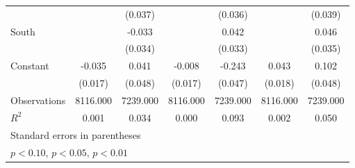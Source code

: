 {\begin{tabular}{l*{6}{c}}
                    &                     &     (0.037)         &                     &     (0.036)         &                     &     (0.039)         \\
\addlinespace
South               &                     &      -0.033         &                     &       0.042         &                     &       0.046         \\
                    &                     &     (0.034)         &                     &     (0.033)         &                     &     (0.035)         \\
\addlinespace
Constant            &      -0.035\sym{**} &       0.041         &      -0.008         &      -0.243\sym{***}&       0.043\sym{**} &       0.102\sym{**} \\
                    &     (0.017)         &     (0.048)         &     (0.017)         &     (0.047)         &     (0.018)         &     (0.048)         \\
\midrule
Observations        &    8116.000         &    7239.000         &    8116.000         &    7239.000         &    8116.000         &    7239.000         \\
\(R^{2}\)           &       0.001         &       0.034         &       0.000         &       0.093         &       0.002         &       0.050         \\
\bottomrule
\multicolumn{7}{l}{\footnotesize Standard errors in parentheses}\\
\multicolumn{7}{l}{\footnotesize \sym{*} \(p<0.10\), \sym{**} \(p<0.05\), \sym{***} \(p<0.01\)}\\
\end{tabular}
}
